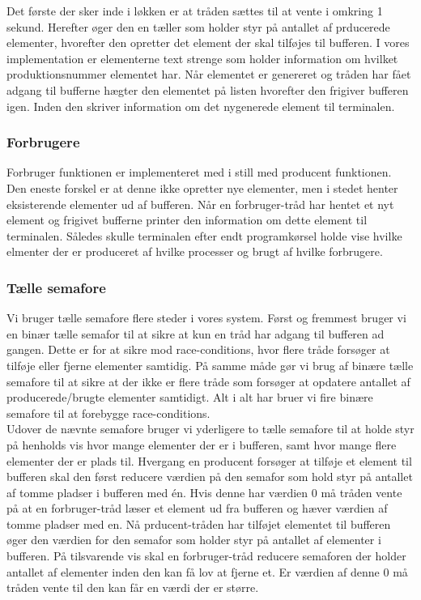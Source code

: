 \documentclass[main.tex]{subfile}
\begin{document}
Det første der sker inde i løkken er at tråden sættes til at vente i omkring 1 sekund. Herefter øger den en tæller som holder styr på antallet af prducerede elementer, hvorefter den opretter det element der skal tilføjes til bufferen. I vores implementation er elementerne text strenge som holder information om hvilket produktionsnummer elementet har. Når elementet er genereret og tråden har fået adgang til bufferne hægter den elementet på listen hvorefter den frigiver bufferen igen. Inden den skriver information om det nygenerede element til terminalen.

\subsubsection{Forbrugere}
Forbruger funktionen er implementeret med i still med producent funktionen. Den eneste forskel er at denne ikke opretter nye elementer, men i stedet henter eksisterende elementer ud af bufferen. Når en forbruger-tråd har hentet et nyt element og frigivet bufferne printer den information om dette element til terminalen. Således skulle terminalen efter endt programkørsel holde vise hvilke elmenter der er produceret af hvilke processer og brugt af hvilke forbrugere. 

\subsubsection{Tælle semafore}
Vi bruger tælle semafore flere steder i vores system. Først og fremmest bruger vi en binær tælle semafor til at sikre at kun en tråd har adgang til bufferen ad gangen. Dette er for at sikre mod race-conditions, hvor flere tråde forsøger at tilføje eller fjerne elementer samtidig. På samme måde gør vi brug af binære tælle semafore til at sikre at der ikke er flere tråde som forsøger at opdatere antallet af producerede/brugte elementer samtidigt. Alt i alt har bruer vi fire binære semafore til at forebygge race-conditions.\\

Udover de nævnte semafore bruger vi yderligere to tælle semafore til at holde styr på henholds vis hvor mange elementer der er i bufferen, samt hvor mange flere elementer der er plads til. 
Hvergang en producent forsøger at tilføje et element til bufferen skal den først reducere værdien på den semafor som hold styr på antallet af tomme pladser i bufferen med én. Hvis denne har værdien 0 må tråden vente på at en forbruger-tråd læser et element ud fra bufferen og hæver værdien af tomme pladser med en. Nå prducent-tråden har tilføjet elementet til bufferen øger den værdien for den semafor som holder styr på antallet af elementer i bufferen. På tilsvarende vis skal en forbruger-tråd reducere semaforen der holder antallet af elementer inden den kan få lov at fjerne et. Er værdien af denne 0 må tråden vente til den kan får en værdi der er større.
\end{document}
